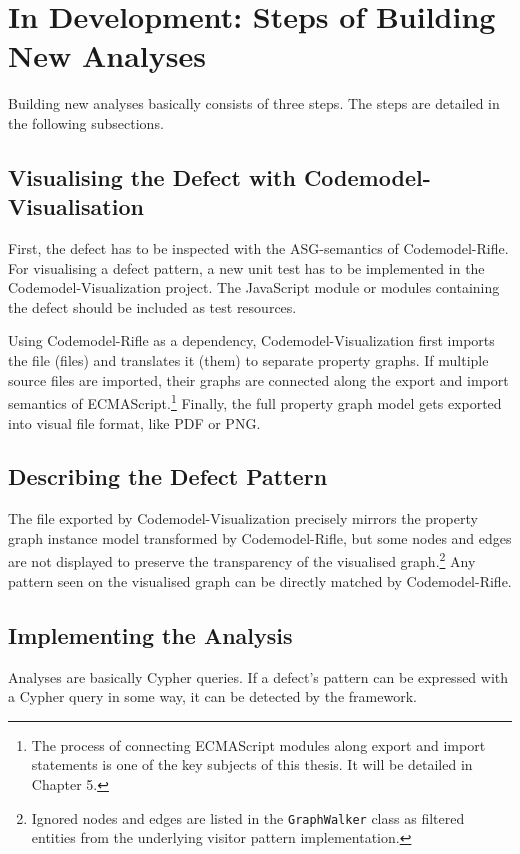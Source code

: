 \section{In Development: Steps of Building New Analyses}

Building new analyses basically consists of three steps. The steps are detailed in the following subsections.


\subsection{Visualising the Defect with Codemodel-Visualisation}

First, the defect has to be inspected with the ASG-semantics of Codemodel-Rifle. For visualising a defect pattern, a new unit test has to be implemented in the Codemodel-Visualization project. The JavaScript module or modules containing the defect should be included as test resources.

Using Codemodel-Rifle as a dependency, Codemodel-Visualization first imports the file (files) and translates it (them) to separate property graphs. If multiple source files are imported, their graphs are connected along the export and import semantics of ECMAScript.\footnote{The process of connecting ECMAScript modules along export and import statements is one of the key subjects of this thesis. It will be detailed in Chapter 5.} Finally, the full property graph model gets exported into visual file format, like PDF or PNG.


\subsection{Describing the Defect Pattern}

The file exported by Codemodel-Visualization precisely mirrors the property graph instance model transformed by Codemodel-Rifle, but some nodes and edges are not displayed to preserve the transparency of the visualised graph.\footnote{Ignored nodes and edges are listed in the \texttt{GraphWalker} class as filtered entities from the underlying visitor pattern implementation.} Any pattern seen on the visualised graph can be directly matched by Codemodel-Rifle.


\subsection{Implementing the Analysis}

Analyses are basically Cypher queries. If a defect's pattern can be expressed with a Cypher query in some way, it can be detected by the framework.

